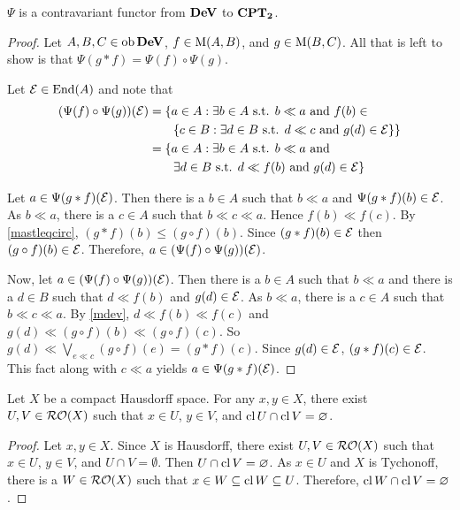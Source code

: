 \begin{theorem}
	\label{psicontra}
	\( \Psi \) is a contravariant functor from \( \bf{DeV} \) to \( \bf{CPT}_\mathbf{2} \).
\end{theorem}
\begin{proof}
	Let \( A,B,C \in \operatorname{ob}{\bf{DeV}} \), \( f \in \operatorname{M}(A,B) \), and \( g \in \operatorname{M}(B,C) \).  All that is left to show is that \( \Psi(g \ast f) = \Psi(f) \circ \Psi(g) \).
	
	Let \( \mathcal{E} \in \operatorname{End}(A) \) and note that
	\begin{align*}
		(\Psi(f) \circ \Psi(g))(\mathcal{E}) &= \{a \in A: \exists b \in A \text{ s.t. } b \ll a \text{ and } f(b) \in \\
		&\qquad \{ c \in B: \exists d \in B \text{ s.t. } d \ll c \text{ and } g(d) \in \mathcal{E} \} \}\\
		&= \{a \in A: \exists b \in A \text{ s.t. } b \ll a \text{ and } \\
		&\qquad \exists d \in B \text{ s.t. } d \ll f(b) \text{ and } g(d) \in \mathcal{E} \}
	\end{align*}
	
	Let \( a \in \Psi(g \ast f)(\mathcal{E}) \).  Then there is a \( b \in A \) such that \( b \ll a \) and \( \Psi(g \ast f)(b) \in \mathcal{E} \).  As \( b \ll a \), there is a \( c \in A \) such that \( b \ll c \ll a \).  Hence \( f(b) \ll f(c) \).  By \ref{mastleqcirc}, \( (g \ast f)(b) \leq (g \circ f)(b) \).  Since \( (g \ast f)(b) \in \mathcal{E} \) then \( (g \circ f)(b) \in \mathcal{E} \).  Therefore, \( a \in (\Psi(f) \circ \Psi(g))(\mathcal{E}) \).
	
	Now, let \( a \in (\Psi(f) \circ \Psi(g))(\mathcal{E}) \).  Then there is a \( b \in A \) such that \( b \ll a \) and there is a \( d \in B \) such that \( d \ll f(b) \) and \( g(d) \in \mathcal{E} \).  As \( b \ll a \), there is a \( c \in A \) such that \( b \ll c \ll a \).  By \ref{mdev}, \( d \ll f(b) \ll f(c) \) and \( g(d) \ll (g \circ f)(b) \ll (g \circ f)(c) \).  So \( g(d) \ll \bigvee_{e \ll c} (g \circ f)(e) = (g \ast f)(c) \).  Since \( g(d) \in \mathcal{E} \), \( (g \ast f)(c) \in \mathcal{E} \).  This fact along with \( c \ll a \) yields \( a \in \Psi(g \ast f)(\mathcal{E}) \).
\end{proof}

\begin{proposition}
	\label{clrosep}
	Let \( X \) be a compact Hausdorff space.  For any \( x,y \in X \), there exist \( U,V \in \operatorname{\mathcal{RO}}(X) \) such that \( x \in U \), \( y \in V \), and \( \operatorname{cl}{U} \cap \operatorname{cl}{V} = \varnothing \).
\end{proposition}
\begin{proof}
	Let \( x,y \in X \).  Since \( X \) is Hausdorff, there exist \( U,V \in \operatorname{\mathcal{RO}}(X) \) such that \( x \in U \), \( y \in V \), and \( U \cap V = \emptyset \).  Then \( U \cap \operatorname{cl}{V} = \varnothing \).  As \( x \in U \) and \( X \) is Tychonoff, there is a \( W \in \operatorname{\mathcal{RO}}(X) \) such that \( x \in W \subseteq \operatorname{cl}{W} \subseteq U \).  Therefore, \( \operatorname{cl}{W} \cap \operatorname{cl}{V} = \varnothing \).
\end{proof}

